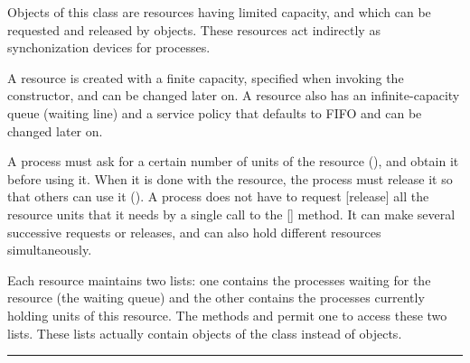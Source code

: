 
Objects of this class are resources having limited capacity,
and which can be requested and released by  objects.
These resources act indirectly as synchonization devices for
processes.

A resource is created with a finite capacity, specified when 
invoking the  constructor, and can be changed
later on.  A resource also has an infinite-capacity queue
(waiting line) and a service policy that defaults to FIFO and
can be changed later on.

A process must ask for a certain number of units of the resource
(), and obtain it before using it.
When it is done with the resource, the process must release 
it so that others can use it ().
A process does not have to request [release] all the resource
units that it needs by a single call to the 
[] method.  It can make several successive requests
or releases, and can also hold different resources simultaneously.

Each resource maintains two lists: one contains the processes 
waiting for the resource (the waiting queue) and the other contains
the processes currently holding units of this resource.
The methods  and  permit one to
access these two lists.
These lists actually contain objects of the class 
instead of  objects.

\bigskip\hrule

